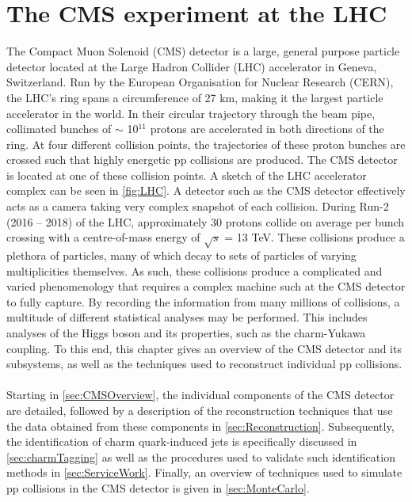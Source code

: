 \chapter{The CMS experiment at the LHC}
\label{chap:CMS}
The Compact Muon Solenoid (CMS) detector \cite{CMSDetector} is a large, general purpose particle detector located at the Large Hadron Collider (LHC)\cite{LHCDesignReport} accelerator in Geneva, Switzerland. Run by the European Organisation for Nuclear Research (CERN), the LHC's ring spans a circumference of 27 km, making it the largest particle accelerator in the world. In their circular trajectory through the beam pipe, collimated bunches of $\sim$ 10$^{11}$ protons are accelerated in both directions of the ring. At four different collision points, the trajectories of these proton bunches are crossed such that highly energetic pp collisions are produced. The CMS detector is located at one of these collision points. A sketch of the LHC accelerator complex can be seen in \autoref{fig:LHC}. A detector such as the CMS detector effectively acts as a camera taking very complex snapshot of each collision. During Run-2 (2016 -- 2018) of the LHC, approximately 30 protons collide on average per bunch crossing with a centre-of-mass energy of $\sqrt{s}$ = 13 TeV. These collisions produce a plethora of particles, many of which decay to sets of particles of varying multiplicities themselves. As such, these collisions produce a complicated and varied phenomenology that requires a complex machine such at the CMS detector to fully capture. By recording the information from many millions of collisions, a multitude of different statistical analyses may be performed. This includes analyses of the Higgs boson and its properties, such as the charm-Yukawa coupling. To this end, this chapter gives an overview of the CMS detector and its subsystems, as well as the techniques used to reconstruct individual pp collisions.\\
\\
Starting in \autoref{sec:CMSOverview}, the individual components of the CMS detector are detailed, followed by a description of the reconstruction techniques that use the data obtained from these components in \autoref{sec:Reconstruction}. Subsequently, the identification of charm quark-induced jets is specifically discussed in \autoref{sec:charmTagging} as well as the procedures used to validate such identification methods in \autoref{sec:ServiceWork}. Finally, an overview of techniques used to simulate pp collisions in the CMS detector is given in \autoref{sec:MonteCarlo}.

